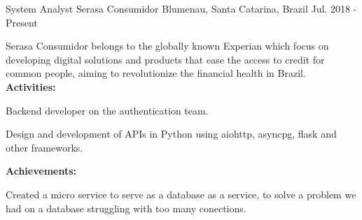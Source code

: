 


\begin{cventries}


\cventry
{System Analyst} %
{Serasa Consumidor} %
{Blumenau, Santa Catarina, Brazil} %
{Jul. 2018 - Present} %
{ %
Serasa Consumidor belongs to the globally known Experian which focus on developing digital solutions and products that ease the access to credit for common people, aiming to revolutionize the financial health in Brazil. \vspace{1.5mm} \hfill \break
\textbf{Activities:} \hfill \break
\begin{cvitems}
\item {Backend developer on the authentication team.}
\item {Design and development of APIs in Python using aiohttp, asyncpg, flask and other frameworks.}
\end{cvitems} \vspace{1.5mm} \hfill \break
\textbf{Achievements:} \hfill \break
\begin{cvitems}
\item {Created a micro service to serve as a database as a service, to solve a problem we had on a database struggling with too many conections.}
\end{cvitems}
}



\end{cventries}
